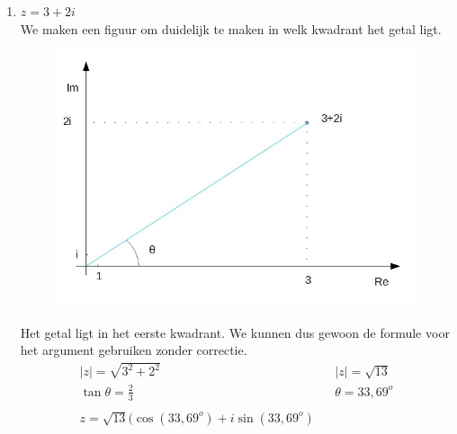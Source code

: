 \begin{enumerate}
	\item $z=3+2i$ \\  We maken een figuur om duidelijk te maken in welk kwadrant het getal ligt. \\
	
	\begin{figure}[h]
		\begin{center}
			\includegraphics[scale=0.5]{3_gonio_complexe_getallen/inputs/complex-getal-voorbeeld1.jpg}
		\end{center}
	\end{figure}
	
	Het getal ligt in het eerste kwadrant. We kunnen dus gewoon de formule voor het argument gebruiken zonder correctie.\\
	\[ \begin{array}{lll}
	|z|=\sqrt{3^2 +2^2} & & |z|=\sqrt{13} \\
	\tan \theta = \frac{2}{3} & & \theta = 33,69^{o}\\
	         & &      \\
	z=\sqrt{13} (\cos (33,69^{o}) + i \sin (33,69^{o})  &  &
	\end{array} \]
	

\end{enumerate}
